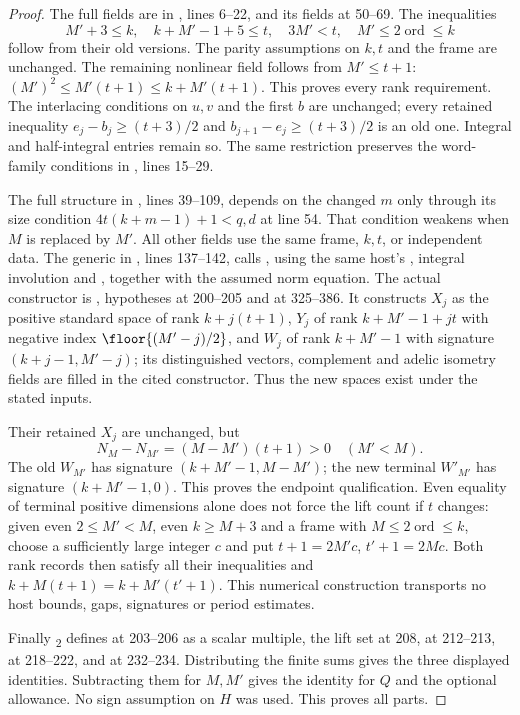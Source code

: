 \begin{proof}
The full  fields are in , lines 6--22, and its  fields at 50--69. The inequalities
\[
 M'+3\le k,\quad k+M'-1+5\le t,\quad 3M'<t,\quad
 M'\le2\operatorname{ord}\le k
\]
follow from their old versions. The parity assumptions on $k,t$ and the frame are unchanged. The remaining nonlinear field follows from $M'\le t+1$:
$(M')^2\le M'(t+1)\le k+M'(t+1)$.
This proves every rank requirement.
The interlacing conditions on $u,v$ and the first $b$ are unchanged; every retained inequality
$e_j-b_j\ge(t+3)/2$ and $b_{j+1}-e_j\ge(t+3)/2$ is an old one. Integral and half-integral entries remain so. The same restriction preserves the word-family conditions in , lines 15--29.

The full  structure in , lines 39--109, depends on the changed $m$ only through its size condition
$4t(k+m-1)+1<q,d$ at line 54. That condition weakens when $M$ is replaced by $M'$. All other fields use the same frame, $k,t$, or independent data.
The generic  in
, lines 137--142, calls , using the same host's , integral involution and , together with the assumed norm equation.
The actual constructor is , hypotheses at 200--205 and  at 325--386. It constructs $X_j$ as the positive standard space of rank $k+j(t+1)$, $Y_j$ of rank $k+M'-1+jt$ with negative index $\floor{(M'-j)/2}$, and $W_j$ of rank $k+M'-1$ with signature $(k+j-1,M'-j)$; its distinguished vectors, complement and adelic isometry fields are filled in the cited constructor. Thus the new spaces exist under the stated inputs.

Their retained $X_j$ are unchanged, but
\[
 N_M-N_{M'}=(M-M')(t+1)>0\quad(M'<M).
\]
The old $W_{M'}$ has signature $(k+M'-1,M-M')$; the new terminal $W'_{M'}$ has signature $(k+M'-1,0)$. This proves the endpoint qualification.
Even equality of terminal positive dimensions alone does not force the lift count if $t$ changes: given even $2\le M'<M$, even $k\ge M+3$ and a frame with $M\le2\operatorname{ord}\le k$, choose a sufficiently large integer $c$ and put
$t+1=2M'c$, $t'+1=2Mc$.
Both rank records then satisfy all their inequalities and
$k+M(t+1)=k+M'(t'+1)$.
This numerical construction transports no host bounds, gaps, signatures or period estimates.

Finally \textsubscript{2} defines  at 203--206 as a scalar multiple, the lift set at 208,  at 212--213,  at 218--222, and  at 232--234. Distributing the finite sums gives the three displayed identities. Subtracting them for $M,M'$ gives the identity for $Q$ and the optional allowance. No sign assumption on $H$ was used. This proves all parts.
\end{proof}

